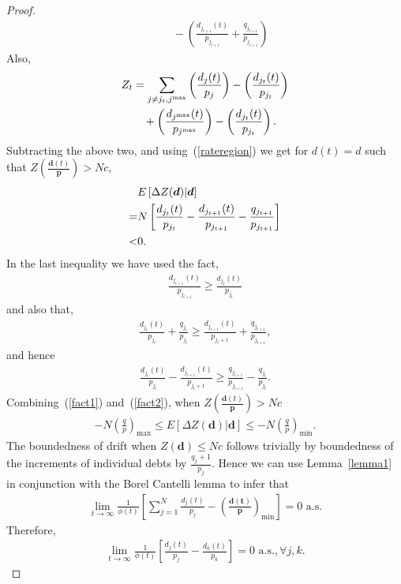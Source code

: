 \documentclass[letterpaper, 10 pt, conference]{ieeeconf}
\begin{document}
\begin{proof}
\begin{align}
&\qquad -\left(\frac{d_{j_{t+1}}(t)}{p_{j_{t+1}}} + \frac{q_{j_{t+1}}}{p_{j_{t+1}}}\right)
\end{align}
Also,
\begin{align}\label{sec:3:lypn2}
 & Z_{t} = \sum_{j\neq j_{t},j^{\max}} \left(\frac{d_{j}(t)}{p_{j}} \right)  -\left(\frac{d_{j_{t}}(t)}{p_{j_{t}}} \right)\notag\\
&\qquad+ \left(\frac{d_{j^{\max}}(t)}{p_{j^{\max}}} \right)  -\left(\frac{d_{j_{t}}(t)}{p_{j_{t}}}\right).
\end{align}
Subtracting the above two, and using~(\ref{rateregion}) we get for $d(t) = d$ such that  $Z\left(\frac{\bm{d}(t)}{\bm{p}}  \right)>Nc$,
\begin{align}\label{sec3:lema11}
& E\left[\Delta Z(\bm{d})| \bm{d} \right]\notag\\
=& N\left[  \frac{d_{j_{t}}(t)}{p_{j_{t}}} - \frac{d_{j_{t+1}}(t)}{p_{j_{t+1}}} - \frac{q_{j_{t+1}}}{p_{j_{t+1}}}  \right]\notag\\
<& 0.
\end{align}
In the last inequality we have used the fact,
\begin{align}\label{fact1}
\frac{d_{j_{t+1}}(t)}{p_{j_{t+1}}} \geq  \frac{d_{j_{t}}(t)}{p_{j_{t}}}
\end{align}
and also that,
\begin{align}
 \frac{d_{j_{t}}(t)}{p_{j_{t}}} + \frac{q_{j_{t}}}{p_{j_{t}}} \geq  \frac{d_{j_{t+1}}(t)}{p_{j_{t}+1}} + \frac{q_{j_{t+1}}}{p_{j_{t+1}}},
 \end{align}
and hence
 \begin{align}\label{fact2}
 \frac{d_{j_{t}}(t)}{p_{j_{t}}} -\frac{d_{j_{t+1}}(t)}{p_{j_{t}+1}} \geq  \frac{q_{j_{t+1}}}{p_{j_{t+1}}} - \frac{q_{j_{t}}}{p_{j_{t}}}.
  \end{align}
Combining~(\ref{fact1}) and~(\ref{fact2}), when $Z\left(\frac{\bm{d}(t)}{\bm{p}}\right)>Nc$  
\begin{align}
-N\left(\frac{q}{p}\right)_{\max}\leq E\left[\Delta Z(\bm{d})| \bm{d}\right]\leq -N\left(\frac{q}{p}\right)_{\min}.
\end{align}
The boundedness of drift when $Z(\bm{d})\leq Nc$ follows trivially by boundedness of the increments of individual debts by $\frac{q_{j}+1}{p_{j}}$. Hence we can use Lemma~\ref{lemma1} in conjunction with the Borel Cantelli lemma to infer that
\begin{align*}
\lim_{t\to\infty}  \frac{1}{\phi(t)} \left[\sum_{j=1}^{N}\frac{d_{j}(t)}{p_{j}}-\left(\bm{\frac{d(t)}{p}}\right)_{\min} \right]= 0\mbox{ a.s.}
\end{align*}
Therefore,
\begin{align*}
\lim_{t\to\infty}  \frac{1}{\phi(t)} \left[\frac{d_{j}(t)}{p_{j}}-\frac{d_{k}(t)}{p_{k}}\right] = 0\mbox{ a.s.},\forall j,k.
\end{align*}
\end{proof}
\end{document}
